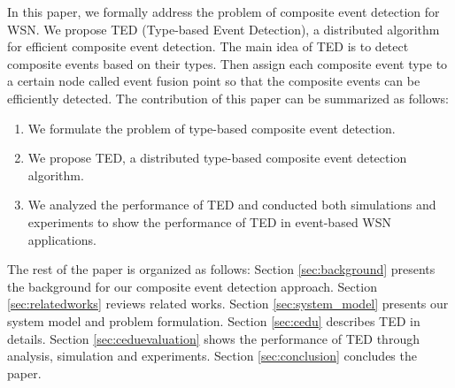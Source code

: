In this paper, we formally address the problem of composite event detection for WSN. We propose TED (Type-based Event Detection), a distributed algorithm for efficient composite event detection. The main idea of TED is to detect composite events based on their types. Then assign each composite event type to a certain node called event fusion point so that the composite events can be efficiently detected. The contribution of this paper can be summarized as follows:
\begin{enumerate}
  \item We formulate the problem of type-based composite event detection.
  \item We propose TED, a distributed type-based composite event detection algorithm.
  \item We analyzed the performance of TED and conducted both simulations and experiments to show the performance of TED in event-based WSN applications.
\end{enumerate}
The rest of the paper is organized as follows: Section \ref{sec:background} presents the background for our composite event detection approach. Section \ref{sec:relatedworks} reviews related works. Section \ref{sec:system_model} presents our system model and problem formulation. Section \ref{sec:cedu} describes TED in details. Section \ref{sec:ceduevaluation} shows the performance of TED through analysis, simulation and experiments. Section \ref{sec:conclusion} concludes the paper.

